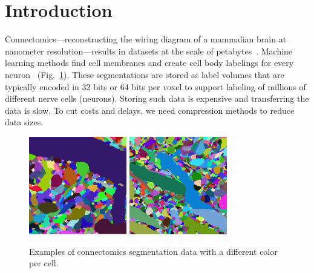 \section{Introduction} \label{sec:i}

Connectomics---reconstructing the wiring diagram of a mammalian brain at nanometer resolution---results in datasets at the scale of petabytes~\cite{suissapeleg2016,haehn_dojo_2014}. Machine learning methods find cell membranes and create cell body labelings for every neuron~\cite{ronneberger2015u,liu2014modular,GALA2014} (Fig.~\ref{fig:data}).
These segmentations are stored as label volumes that are typically encoded in 32 bits or 64 bits per voxel to support labeling of millions of different nerve cells (neurons).  Storing such data is expensive and transferring the data is slow. To cut costs and delays, we need compression methods to reduce data sizes.


\begin{figure}[h]
	\begin{center}
		\includegraphics[width=0.38\textwidth]{gfx/ac3.png}%
		\hspace{0.12\textwidth}
		\includegraphics[width=0.38\textwidth]{gfx/cyl.png}%
	\end{center}
\caption{Examples of connectomics segmentation data with a different color per cell.}
\label{fig:data}
\end{figure}

